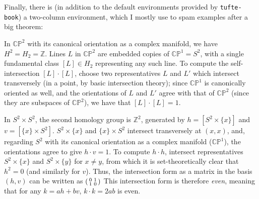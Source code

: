 \documentclass[justified, nofonts, notitlepage, openany, debug]{tufte-book}
\begin{document}
Finally, there is (in addition to the default environments provided by \texttt{tufte-book}) a two-column environment, which I mostly use to spam examples after a big theorem:
\begin{twocol}
\begin{example}
    In $\mathbb{CP}^2$ with its canonical orientation as a complex manifold, we have $H^2 = H_2 = \mathbb{Z}$. Lines $L$ in $\mathbb{CP}^2$ are embedded copies of $\mathbb{CP}^1 = S^2$, with a single fundamental class $[L] \in H_2$ representing any such line. To compute the self-intersection $[L] \cdot [L]$, choose two representatives $L$ and $L'$ which intersect transversely (in a point, by basic intersection theory); since $\mathbb{CP}^1$ is canonically oriented as well, and the orientations of $L$ and $L'$ agree with that of $\mathbb{CP}^2$ (since they are subspaces of $\mathbb{CP}^2$), we have that $[L] \cdot [L] = 1$. 
\end{example}
\begin{example}
    In $S^2 \times S^2$, the second homology group is $\mathbb{Z}^2$, generated by $h = [S^2 \times \{x\}]$ and $v = [\{x\} \times S^2]$. $S^2 \times \{x\}$ and $\{x\} \times S^2$ intersect transversely at $(x,x)$, and, regarding $S^2$ with its canonical orientation as a complex manifold ($\mathbb{CP}^1$), the orientations agree to give $h \cdot v = 1$. To compute $h \cdot h$, intersect representatives $S^2 \times \{x\}$ and $S^2 \times \{y\}$ for $x \neq y$, from which it is set-theoretically clear that $h^2 = 0$ (and similarly for $v$). Thus, the intersection form as a matrix in the basis $(h,v)$ can be written as $\begin{psmallmatrix} 0 & 1 \\ 1 & 0 \end{psmallmatrix}$ This intersection form is therefore \textit{even}, meaning that for any $k = ah+bv$, $k \cdot k = 2ab$ is even.
\end{example}
\end{twocol}

\nocite{*} %



\end{document}
